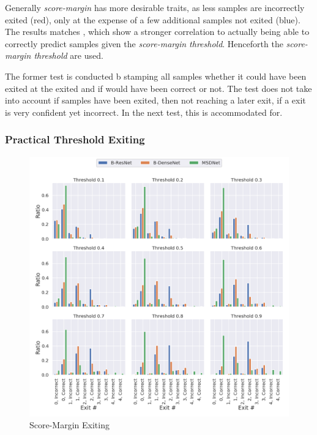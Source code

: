 Generally \emph{score-margin} has more desirable traits, as less samples are incorrectly exited (red), only at the expense of a few additional samples not exited ({\color{sns-blue}blue}). The results matches \cite{park_big/little_2015}, which show a stronger correlation to actually being able to correctly predict samples given the \emph{score-margin threshold}. Henceforth the \emph{score-margin threshold} are used.

The former test is conducted b stamping all samples whether it could have been exited at the exited and if would have been correct or not. The test does not take into account if samples have been exited, then not reaching a later exit, if a exit is very confident yet incorrect. In the next test, this is accommodated for.

\subsubsection{Practical Threshold Exiting}

\begin{figure}
	\centering
	\includegraphics[width=\linewidth]{figures/threshold_plots/inference_threshold_test}
	\caption{Score-Margin Exiting}
	\label{fig:inferencethresholdtest}
\end{figure}

